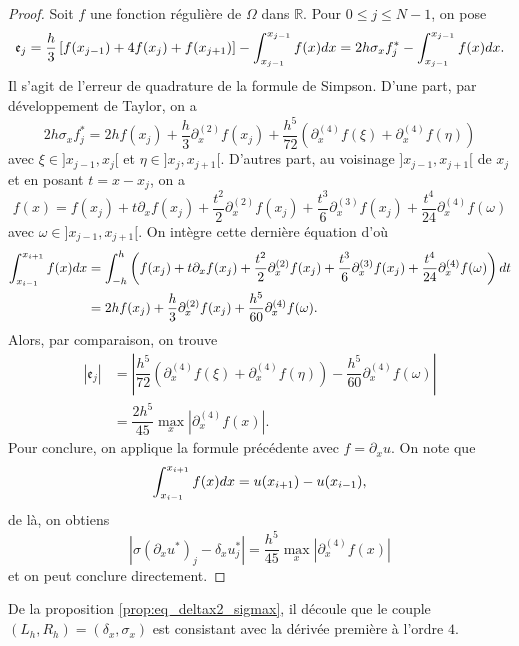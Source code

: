 \begin{itemize}
\begin{proof}
Soit $f$ une fonction régulière de $\Omega$ dans $\mathbb{R}$. Pour $0 \leq j \leq N-1$, on pose
\begin{equation}
\mathfrak{e}_j = \dfrac{h}{3} \left[ f(x_{j-1}) + 4 f(x_j) + f(x_{j+1}) \right] - \displaystyle\int_{x_{j-1}}^{x_{j-1}} f(x) dx = 2h \sigma_x f^*_j - \displaystyle\int_{x_{j-1}}^{x_{j-1}} f(x) dx.
\end{equation}
Il s'agit de l'erreur de quadrature de la formule de Simpson.
D'une part, par développement de Taylor, on a
\begin{equation}
2h \sigma_x f^*_j = 2h f(x_j) + \dfrac{h}{3}\partial_x^{(2)}f(x_j) + \dfrac{h^5}{72} \left( \partial_x^{(4)}f(\xi) + \partial_x^{(4)}f(\eta) \right) 
\end{equation}
avec $\xi \in ]x_{j-1}, x_j[$ et $\eta \in ]x_j, x_{j+1}[$.
D'autres part, au voisinage $]x_{j-1}, x_{j+1}[$ de $x_j$ et en posant $t=x-x_j$, on a 
\begin{equation}
f(x) = f(x_j) + t \partial_x f(x_j) + \dfrac{t^2}{2} \partial_x^{(2)} f(x_j) + \dfrac{t^3}{6} \partial_x^{(3)} f(x_j) + \dfrac{t^4}{24} \partial_x^{(4)} f(\omega)
\end{equation}
avec $\omega \in ]x_{j-1}, x_{j+1}[$. On intègre cette dernière équation d'où
\begin{align*}
\displaystyle\int_{x_{i-1}}^{x_{i+1}} f(x) dx & = \displaystyle\int_{-h}^h \left( f(x_j) + t \partial_x f(x_j) + \dfrac{t^2}{2} \partial_x^{(2)} f(x_j) + \dfrac{t^3}{6} \partial_x^{(3)} f(x_j) + \dfrac{t^4}{24} \partial_x^{(4)} f(\omega) \right) dt \\
	& = 2h f(x_j) + \dfrac{h}{3}\partial_x^{(2)}f(x_j) + \dfrac{h^5}{60}\partial_x^{(4)} f(\omega).
\end{align*}
Alors, par comparaison, on trouve
\begin{align*}
|\mathfrak{e}_j| & = |\dfrac{h^5}{72} \left( \partial_x^{(4)}f(\xi) + \partial_x^{(4)}f(\eta) \right)  - \dfrac{h^5}{60}\partial_x^{(4)} f(\omega)|  \\
	& = \dfrac{2 h^5}{45} \max_{x} |\partial_x^{(4)} f(x)|.
\end{align*}
Pour conclure, on applique la formule précédente avec $f = \partial_x u$. On note que 
\begin{equation}
\displaystyle\int_{x_{i-1}}^{x_{i+1}}f(x) dx = u(x_{i+1}) - u(x_{i-1}),
\end{equation}
de là, on obtiens
\begin{equation}
|\sigma \left( \partial_x u^* \right)_j - \delta_x u^*_j | = \dfrac{h^5}{45}\max_{x} |\partial_x^{(4)} f(x)|
\end{equation}
et on peut conclure directement.
\end{proof}
De la proposition \ref{prop:eq_deltax2_sigmax}, il découle que le couple $(L_h, R_h) = (\delta_x, \sigma_x)$ est consistant avec la dérivée première à l'ordre $4$.
\end{itemize}

